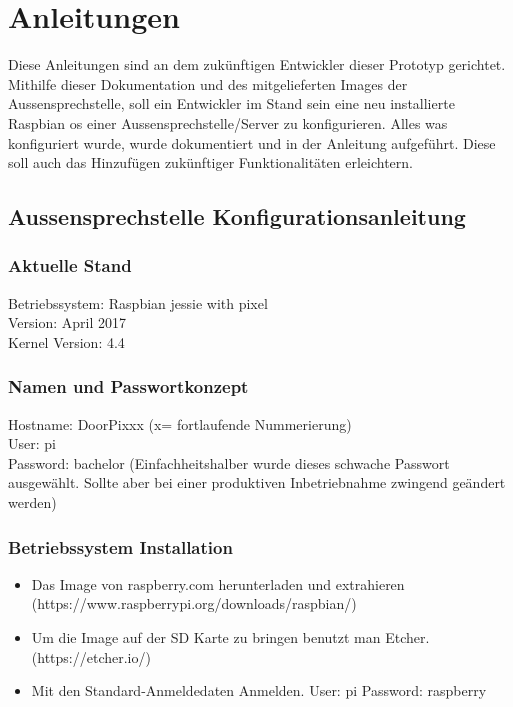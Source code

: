 \section{Anleitungen}
\label{sec:anleitungen}
Diese Anleitungen sind an dem zukünftigen Entwickler dieser Prototyp gerichtet. Mithilfe dieser Dokumentation und des mitgelieferten Images der Aussensprechstelle, soll ein Entwickler im Stand sein eine neu installierte Raspbian \gls{os} einer Aussensprechstelle/Server zu konfigurieren. Alles was konfiguriert wurde, wurde dokumentiert und in der Anleitung aufgeführt. Diese soll auch das Hinzufügen zukünftiger Funktionalitäten erleichtern.

\subsection{Aussensprechstelle Konfigurationsanleitung}

\subsubsection{Aktuelle Stand}
Betriebssystem:	Raspbian jessie with pixel\\
Version: April 2017\\
Kernel Version: 4.4

\subsubsection{Namen und Passwortkonzept}
Hostname: DoorPixxx (x= fortlaufende Nummerierung)\\
User: pi\\
Password: bachelor (Einfachheitshalber wurde dieses schwache Passwort ausgewählt. Sollte aber bei einer produktiven Inbetriebnahme zwingend geändert werden)\\

\subsubsection{Betriebssystem Installation}
\begin{itemize}
	\item Das Image von raspberry.com herunterladen und extrahieren \\ (https://www.raspberrypi.org/downloads/raspbian/)
	\item Um die Image auf der SD Karte zu bringen benutzt man Etcher.  (https://etcher.io/)
	\item Mit den Standard-Anmeldedaten Anmelden. User: pi Password: raspberry
\end{itemize}



